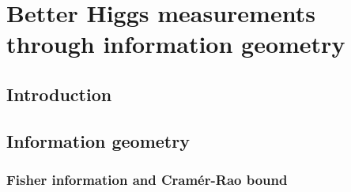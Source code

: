 





\chapter{Better Higgs measurements through information geometry}
\label{chapter:information}



\section{Introduction}
\label{sec:information_intro}

\section{Information geometry}
\label{sec:information_formalism}

\subsection{Fisher information and Cram\'er-Rao bound}

